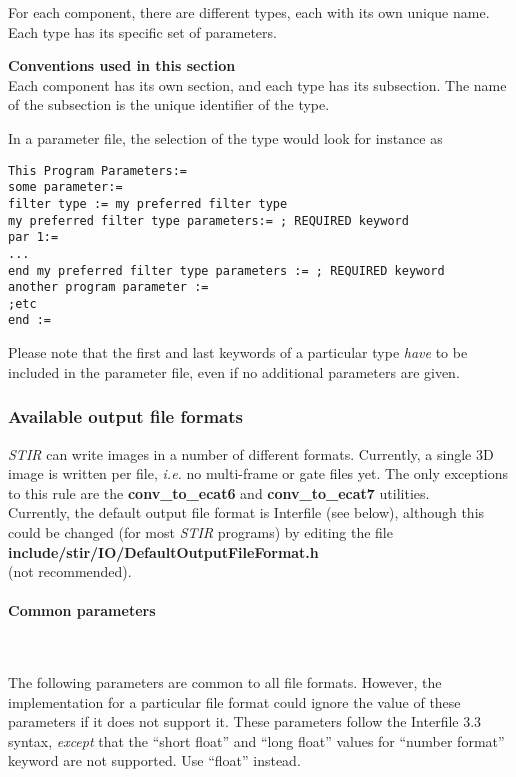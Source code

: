 \documentclass{article}
\newcommand{\subsubsubsection}[1]{\paragraph{#1}\mbox{} \\}
\begin{document}
{{For each component, there are different types, each with its 
own unique name. Each type has its specific set of parameters. 

\textbf{Conventions used in this section}\\
Each component has its own section, and each type has its subsection. 
The name of the subsection is the unique identifier of the type.


In a parameter file, the selection of the type would look for 
instance as

\begin{verbatim}
This Program Parameters:=
some parameter:=
filter type := my preferred filter type 
my preferred filter type parameters:= ; REQUIRED keyword 
par 1:= 
... 
end my preferred filter type parameters := ; REQUIRED keyword
another program parameter :=
;etc
end :=
\end{verbatim}


Please note that the first and last keywords of a particular 
type \textit{have} to be included in the parameter file, even if no 
additional parameters are given.


\subsubsection{
Available output file formats}
\label{sec:outputfileformats}

\textit{STIR} can write images in a number of different formats. Currently, 
a single 3D image is written per file, \textit{i.e.} no multi-frame 
or gate files yet. The only exceptions to this rule are the \textbf{conv\_to\_ecat6} 
and \textbf{conv\_to\_ecat7} utilities.\\
Currently, the default output file format is Interfile (see below), 
although this could be changed (for most \textit{STIR} programs) by 
editing the file\\
 \textbf{include/stir/IO/DefaultOutputFileFormat.h}\\ 
(not recommended).

{ \subsubsubsection{Common parameters}
}
\label{ref:outputcommonparameters}
The following parameters are common to all file formats. However, 
the implementation for a particular file format could ignore 
the value of these parameters if it does not support it. These 
parameters follow the Interfile 3.3 syntax, \textit{except} that the 
``short float'' and ``long float'' values for ``number format'' 
keyword are not supported. Use ``float'' instead.


}}
\end{document}
